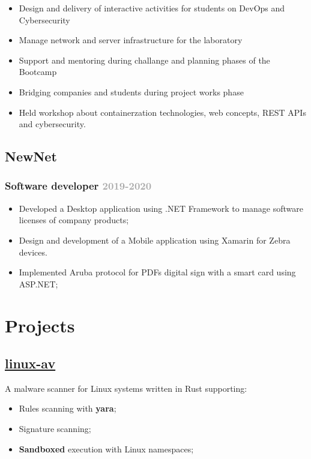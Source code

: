 \documentclass[10pt,a4paper]{article}
\begin{document}
  \begin{itemize}
    \item Design and delivery of interactive activities for students on DevOps and Cybersecurity
    \item Manage network and server infrastructure for the laboratory
    \item Support and mentoring during challange and planning phases of the Bootcamp
    \item Bridging companies and students during project works phase
    \item Held workshop about containerzation technologies, web concepts, REST APIs and cybersecurity.  
  \end{itemize}

  \subsection{NewNet}
  \subsubsection{Software developer \hfill \textcolor{darkgray}{\small{2019-2020}}}
  \begin{itemize}
    \item Developed a Desktop application using .NET Framework to manage software licenses of company products;
    \item Design and development of a Mobile application using Xamarin for Zebra devices.
    \item Implemented Aruba protocol for PDFs digital sign with a smart card using ASP.NET;
  \end{itemize}

  \section{Projects}
  \subsection{\href{https://github.com/alarmfox/linux-av}{linux-av}} A malware scanner for Linux systems written in Rust supporting:
 \begin{itemize}
  \item Rules scanning with \textbf{yara};
  \item Signature scanning;
  \item \textbf{Sandboxed} execution with Linux namespaces;
 \end{itemize}
  
\end{document}
